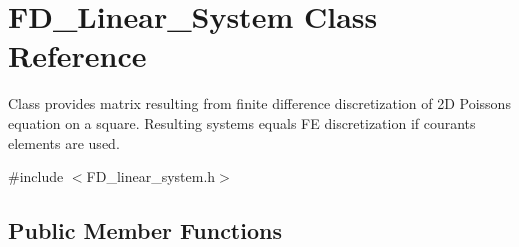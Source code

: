 \hypertarget{classFD__Linear__System}{}\section{F\+D\+\_\+\+Linear\+\_\+\+System Class Reference}
\label{classFD__Linear__System}


Class provides matrix resulting from finite difference discretization of 2D Poisson\textquotesingle{}s equation on a square. Resulting systems equals FE discretization if courants elements are used.  




{\ttfamily \#include $<$F\+D\+\_\+linear\+\_\+system.\+h$>$}

\subsection*{Public Member Functions}
